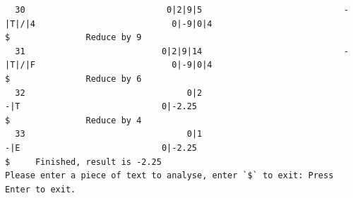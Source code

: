 \documentclass[UTF8]{ctexart}
\begin{document}
\begin{lstlisting}
  30                            0|2|9|5                            -|T|/|4                           0|-9|0|4                                  $               Reduce by 9
  31                           0|2|9|14                            -|T|/|F                           0|-9|0|4                                  $               Reduce by 6
  32                                0|2                                -|T                            0|-2.25                                  $               Reduce by 4
  33                                0|1                                -|E                            0|-2.25                                  $     Finished, result is -2.25
Please enter a piece of text to analyse, enter `$` to exit: Press Enter to exit.
    \end{lstlisting}
\end{document}
